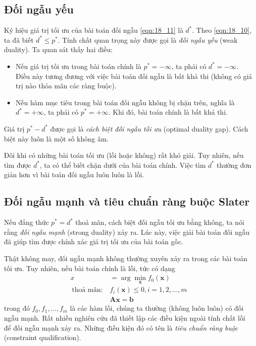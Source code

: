 \subsection{Đối ngẫu yếu}
Ký hiệu giá trị tối ưu của bài toán đối ngẫu \eqref{eqn:18_11} là $d^*$. Theo
\eqref{eqn:18_10}, ta đã biết $d^* \leq p^*$. Tính chất quan trọng này được
gọi là \textit{đối ngẫu yếu} (weak duality). 
Ta quan sát thấy hai điều: 
\begin{itemize}
    \item Nếu giá trị tối ưu trong bài toán chính là $p^* = -\infty$, ta phải có $d^* = -\infty$. Điều này tương đương với việc bài toán đối ngẫu là bất khả thi (không có giá trị nào thỏa mãn các ràng buộc).
     
    \item Nếu hàm mục tiêu trong bài toán đối ngẫu không bị chặn trên, nghĩa là $d^*
    = +\infty$, ta phải có $p^* = +\infty$. Khi đó, bài toán chính là bất khả thi.
\end{itemize}
 
Giá trị $p^* - d^*$ được gọi là \textit{cách biệt đối ngẫu tối ưu} (optimal duality gap). Cách biệt này luôn là một số không âm.  
 
Đôi khi có những bài toán tối ưu (lồi hoặc không) rất khó giải. Tuy nhiên, nếu tìm được $d^*$, ta có thể biết chặn dưới của bài toán chính. Việc tìm 
$d^*$ thường đơn giản hơn vì bài toán đối ngẫu luôn luôn là lồi.  
 
 
\subsection{Đối ngẫu mạnh và tiêu chuẩn ràng buộc Slater}
\label{ssec:slatter}
Nếu đẳng thức $p^* = d^*$ thoả mãn, cách biệt đối ngẫu tối ưu bằng 
không, ta nói rằng \textit{đối ngẫu mạnh} (strong duality) xảy ra. Lúc này, việc giải bài 
toán đối ngẫu đã giúp tìm được {chính xác} giá trị tối ưu của bài toán gốc.  
 
Thật không may, đối ngẫu mạnh không thường xuyên xảy ra trong các 
bài toán tối ưu. Tuy nhiên, nếu bài toán chính là lồi, tức có dạng
\begin{equation} 
    \label{eqn:18_12}
    \begin{aligned}
    x &= \arg \min_{\mathbf{x}} f_0(\mathbf{x})   \\\ 
    \text{thoả mãn:}~ & f_i(\mathbf{x}) \leq 0, i = 1, 2, \dots, m\\\ 
    & \mathbf{Ax} = \mathbf{b} 
    \end{aligned}
\end{equation} 
trong đó $f_0, f_1, \dots, f_m$ là các hàm lồi, chúng ta {thường} 
(không luôn luôn) có đối ngẫu mạnh. Rất nhiều nghiên cứu đã thiết lập các điều kiện ngoài tính chất lồi để đối ngẫu mạnh xảy ra. Những điều kiện đó có tên là \textit{tiêu chuẩn ràng buộc} (constraint qualification).

